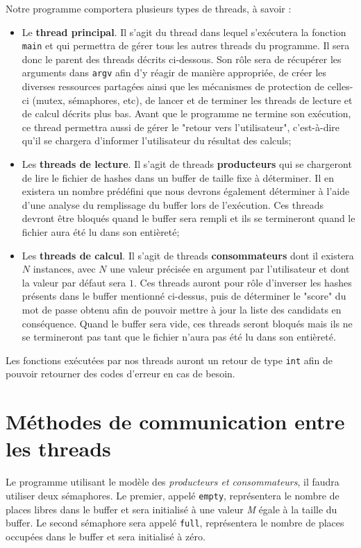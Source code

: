 \documentclass{article}
\begin{document}
	\noindent
	Notre programme comportera plusieurs types de threads, à savoir :
	
	\begin{itemize}
		\item
		Le \textbf{thread principal}.
		Il s'agit du thread dans lequel s'exécutera la fonction \lstinline{main} et qui permettra de gérer tous les autres threads du programme.
		Il sera donc le parent des threads décrits ci-dessous.
		Son rôle sera de récupérer les arguments dans \lstinline{argv} afin d'y réagir de manière appropriée, de créer les diverses ressources partagées ainsi que les mécanismes de protection de celles-ci (mutex, sémaphores, etc), de lancer et de terminer les threads de lecture et de calcul décrits plus bas.
		Avant que le programme ne termine son exécution, ce thread permettra aussi de gérer le "retour vers l'utilisateur", c'est-à-dire qu'il se chargera d'informer l'utilisateur du résultat des calculs;
		
		\item
		Les \textbf{threads de lecture}.
		Il s'agit de threads \textbf{producteurs} qui se chargeront de lire le fichier de hashes dans un buffer de taille fixe à déterminer.
		Il en existera un nombre prédéfini que nous devrons également déterminer à l'aide d'une analyse du remplissage du buffer lors de l'exécution.
		Ces threads devront être bloqués quand le buffer sera rempli et ils se termineront quand le fichier aura été lu dans son entièreté;
		
		\item
		Les \textbf{threads de calcul}.
		Il s'agit de threads \textbf{consommateurs} dont il existera $N$ instances, avec $N$ une valeur précisée en argument par l'utilisateur et dont la valeur par défaut sera $1$.
		Ces threads auront pour rôle d'inverser les hashes présents dans le buffer mentionné ci-dessus, puis de déterminer le "score" du mot de passe obtenu afin de pouvoir mettre à jour la liste des candidats en conséquence.
		Quand le buffer sera vide, ces threads seront bloqués mais ils ne se termineront pas tant que le fichier n'aura pas été lu dans son entièreté.
	\end{itemize}
	
	\noindent
	Les fonctions exécutées par nos threads auront un retour de type \lstinline{int} afin de pouvoir retourner des codes d'erreur en cas de besoin.

\section{Méthodes de communication entre les threads}
	Le programme utilisant le modèle des \textit{producteurs et consommateurs}, il faudra utiliser deux sémaphores.
	Le premier, appelé \lstinline{empty}, représentera le nombre de places libres dans le buffer et sera initialisé à une valeur \textit{M} égale à la taille du buffer.
	Le second sémaphore sera appelé \lstinline{full}, représentera le nombre de places occupées dans le buffer et sera initialisé à zéro.\\	
	
\end{document}
